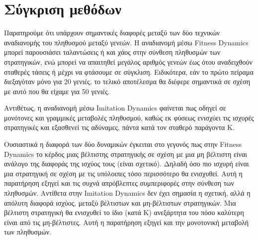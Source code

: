\documentclass[a4paper,12pt]{article}
\begin{document}
\newpage
\section{Σύγκριση μεθόδων}
Παρατηρούμε ότι υπάρχουν σημαντικές διαφορές μεταξύ των δύο τεχνικών αναδιανομής του πληθυσμού μεταξύ γενεών. Η αναδιανομή μέσω \foreignlanguage{english}{Fitness Dynamics} μπορεί παρουσιάσει ταλαντώσεις ή και χάος στην σύνθεση πληθυσμών των στρατηγικών, ενώ μπορεί να απαιτηθεί μεγάλος αριθμός γενεών έως ότου αναδειχθούν σταθερές τάσεις ή μέχρι να φτάσουμε σε σύγκλιση. Ειδικότερα, εάν το πρώτο πείραμα διεξαγόταν μόνο για 20 γενιές, το τελικό αποτέλεσμα θα διέφερε σημαντικά σε σχέση με αυτό που θα είχαμε για 50 γενιές.

Αντιθέτως, η αναδιανομή μέσω \foreignlanguage{english}{Imitation Dynamics} φαίνεται πως οδηγεί σε μονότονες και γραμμικές μεταβολές πληθυσμού, καθώς εκ φύσεως ενισχύει τις ισχυρές στρατηγικές και εξασθενεί τις αδύναμες, πάντα κατά τον σταθερό παράγοντα Κ.

Ουσιαστικά η διαφορά των δύο δυναμικών έγκειται στο γεγονός πως στην \foreignlanguage{english}{Fitness Dynamics} το κέρδος μιας βέλτιστης στρατηγικής σε σχέση με μια μη βέλτιστη είναι ανάλογο της διαφοράς της ισχύος τους (είναι σχετικό). Δηλαδή όσο πιο ισχυρή είναι μια στρατηγική σε σχέση με τις υπόλοιπες τόσο περισσότερο θα ενισχυθεί.
Αυτή η παρατήρηση εξηγεί και τις συχνά απρόβλεπτες συμπεριφορές στην σύνθεση των πληθυσμών.
Αντίθετα στην \foreignlanguage{english}{Imitation Dynamics} δεν έχει σημασία η σχετική, αλλά η απόλυτη διαφορά ισχύος, μεταξύ βέλτιστων και μη-βέλτιστων στρατηγικών. Μια βέλτιστη στρατηγική θα ενισχυθεί το ίδιο (κατά Κ) ανεξάρτητα του πόσο καλύτερη είναι από τις μη-βέλτιστες.
Αυτή η παρατήρηση εξηγεί και την μονοτονική μεταβολή των πληθυσμών.
\end{document}

